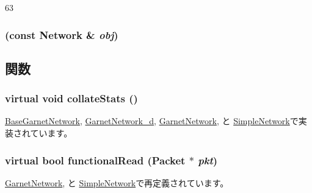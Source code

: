 \begin{DoxyCode}
63 {}
\end{DoxyCode}
\hypertarget{classNetwork_a287984c6c6962bfd126e05b10c13a511}{
\subsubsection[{Network}]{ (const {\bf Network} \& {\em obj})}}
\label{classNetwork_a287984c6c6962bfd126e05b10c13a511}


\subsection{関数}
\hypertarget{classNetwork_ab6b1b00ea63b4d41ec52e154052d47ee}{
\subsubsection[{collateStats}]{\setlength{\rightskip}{0pt plus 5cm}virtual void collateStats ()}}
\label{classNetwork_ab6b1b00ea63b4d41ec52e154052d47ee}


\hyperlink{classBaseGarnetNetwork_ae3089fd60541650eefd9605c2c1abc68}{BaseGarnetNetwork}, \hyperlink{classGarnetNetwork__d_a208669cbc0bb1d52565956ca8c690c55}{GarnetNetwork\_\-d}, \hyperlink{classGarnetNetwork_a208669cbc0bb1d52565956ca8c690c55}{GarnetNetwork}, と \hyperlink{classSimpleNetwork_a208669cbc0bb1d52565956ca8c690c55}{SimpleNetwork}で実装されています。\hypertarget{classNetwork_a32ecdf2d815f1224a090f1d2b27b2c00}{
\subsubsection[{functionalRead}]{\setlength{\rightskip}{0pt plus 5cm}virtual bool functionalRead ({\bf Packet} $\ast$ {\em pkt})}}
\label{classNetwork_a32ecdf2d815f1224a090f1d2b27b2c00}


\hyperlink{classGarnetNetwork_a729f57f557bb42c045c47d9388f1030e}{GarnetNetwork}, と \hyperlink{classSimpleNetwork_a729f57f557bb42c045c47d9388f1030e}{SimpleNetwork}で再定義されています。


